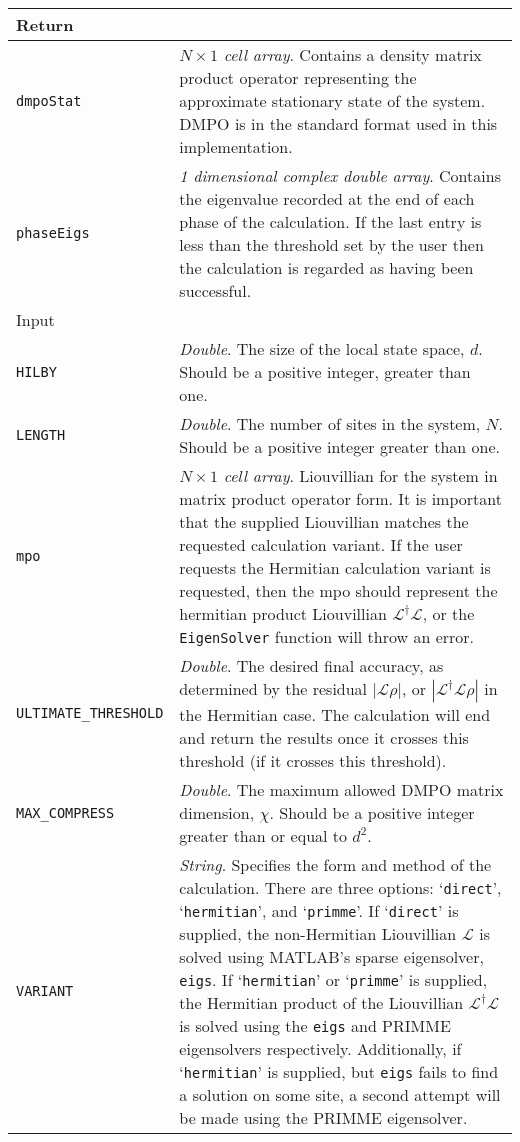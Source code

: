  \begin{longtabu}{X[1,1]X[4,1]}
 \hline
 Return & \\ \hline
 \lstinline$dmpoStat$ & \emph{\(N \times 1\) cell array}. Contains a density matrix product operator representing the approximate stationary state of the system. DMPO is in the standard format used in this implementation. \\
 \lstinline$phaseEigs$ & \emph{1 dimensional complex double array}. Contains the eigenvalue recorded at the end of each phase of the calculation. If the last entry is less than the threshold set by the user then the calculation is regarded as having been successful. \\ \hline
 Input & \\ \hline
 \lstinline$HILBY$ & \emph{Double}. The size of the local state space, \(d\). Should be a positive integer, greater than one. \\
 \lstinline$LENGTH$ & \emph{Double}. The number of sites in the system, \(N\). Should be a positive integer greater than one. \\
 \lstinline$mpo$ & \emph{\(N \times 1\) cell array}. Liouvillian for the system in matrix product operator form. It is important that the supplied Liouvillian matches the requested calculation variant. If the user requests the Hermitian calculation variant is requested, then the mpo should represent the hermitian product Liouvillian \(\mathcal{L}^{\dagger}\mathcal{L}\), or the \lstinline$EigenSolver$ function will throw an error. \\
 \lstinline$ULTIMATE_THRESHOLD$ & \emph{Double}. The desired final accuracy, as determined by the residual \(|\mathcal{L}\rho|\), or \(|\mathcal{L}^{\dagger}\mathcal{L}\rho|\) in the Hermitian case. The calculation will end and return the results once it crosses this threshold (if it crosses this threshold). \\
 \lstinline$MAX_COMPRESS$ & \emph{Double}. The maximum allowed DMPO matrix dimension, \(\chi\). Should be a positive integer greater than or equal to \(d^{2}\). \\
 \lstinline$VARIANT$ & \emph{String}. Specifies the form and method of the calculation. There are three options: `\lstinline$direct$', `\lstinline$hermitian$', and `\lstinline$primme$'. If `\lstinline$direct$' is supplied, the non-Hermitian Liouvillian \(\mathcal{L}\) is solved using MATLAB's sparse eigensolver, \lstinline$eigs$. If `\lstinline$hermitian$' or `\lstinline$primme$' is supplied, the Hermitian product of the Liouvillian \(\mathcal{L}^{\dagger}\mathcal{L}\) is solved using the \lstinline$eigs$ and PRIMME eigensolvers respectively. Additionally, if `\lstinline$hermitian$' is supplied, but \lstinline$eigs$ fails to find a solution on some site, a second attempt will be made using the PRIMME eigensolver. \\
 \hline 
 \end{longtabu}
